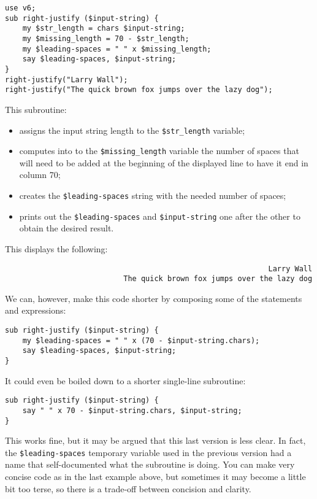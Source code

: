 \begin{verbatim}
use v6;
sub right-justify ($input-string) {
    my $str_length = chars $input-string;
    my $missing_length = 70 - $str_length;
    my $leading-spaces = " " x $missing_length;
    say $leading-spaces, $input-string;
}
right-justify("Larry Wall");
right-justify("The quick brown fox jumps over the lazy dog");
\end{verbatim}

This subroutine:
\begin{itemize}
\item assigns the input string length to the \verb'$str_length' variable;
\item computes into to the \verb'$missing_length' variable the 
number of spaces that will need to be added at the beginning 
of the displayed line to have it end in column 70;
\item creates the \verb'$leading-spaces' string with the 
needed number of spaces;
\item prints out the \verb'$leading-spaces' and 
\verb'$input-string' one after the other to obtain the desired 
result.
\end{itemize}

This displays the following:

\begin{verbatim}
                                                            Larry Wall
                           The quick brown fox jumps over the lazy dog
\end{verbatim}

We can, however, make this code shorter by composing some of the 
statements and expressions:

\begin{verbatim}
sub right-justify ($input-string) {
    my $leading-spaces = " " x (70 - $input-string.chars);
    say $leading-spaces, $input-string;
}
\end{verbatim}

It could even be boiled down to a shorter single-line subroutine:

\begin{verbatim}
sub right-justify ($input-string) {
    say " " x 70 - $input-string.chars, $input-string;
}
\end{verbatim}

This works fine, but it may be argued that this last version is 
less clear. In fact, the \verb'$leading-spaces' temporary 
variable used in the previous version had a name that 
self-documented what the subroutine is doing. You can make 
very concise code as in the last example above, but sometimes 
it may become a little bit too terse, so there is a trade-off 
between concision and clarity.

